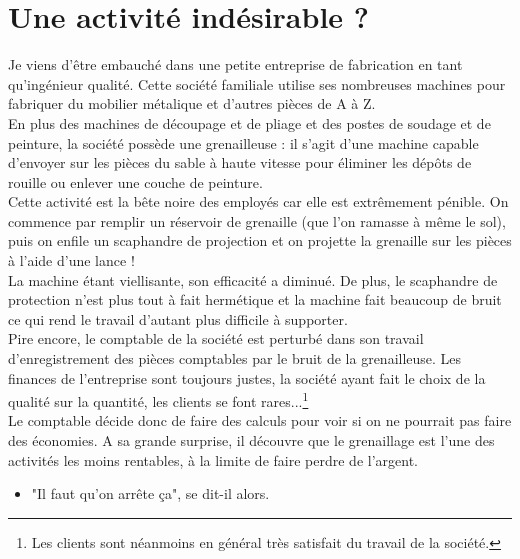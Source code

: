 
\chapter{Une activité indésirable ?}


Je viens d'être embauché dans une petite entreprise de 
fabrication en tant qu'ingénieur qualité. Cette société 
familiale utilise ses nombreuses machines pour fabriquer 
du mobilier métalique et d'autres pièces de A à Z. \\
\hspace*{\parindent}En plus des machines de découpage et de pliage et des postes  
de soudage et de peinture, la société possède une grenailleuse :
il s'agit d'une machine capable d'envoyer sur les pièces du 
sable à haute vitesse pour éliminer les dépôts de rouille ou 
enlever une couche de peinture. \\
\hspace*{\parindent}Cette activité est la bête noire des employés car elle est 
extrêmement pénible. On commence par remplir un réservoir de 
grenaille (que l'on ramasse à même le sol), puis on 
enfile un scaphandre de projection et on projette la grenaille 
sur les pièces à l'aide d'une lance ! \\
\hspace*{\parindent}La machine étant viellisante, son efficacité a diminué. 
De plus, le scaphandre de protection n'est plus tout à fait 
hermétique et la machine fait beaucoup de bruit ce qui rend 
le travail d'autant plus difficile à supporter. \\
\hspace*{\parindent}Pire encore, le comptable de la société est perturbé dans son 
travail d'enregistrement des pièces comptables par le bruit de 
la grenailleuse. Les finances de l'entreprise sont toujours 
justes, la société ayant fait le choix de la qualité sur la 
quantité, les clients se font rares...\footnote{Les clients 
sont néanmoins en général très satisfait du travail de la 
société.} \\ 
\hspace*{\parindent}Le comptable décide donc de faire des calculs pour voir si on 
ne pourrait pas faire des économies. A sa grande surprise, il 
découvre que le grenaillage est l'une des activités les moins 
rentables, à la limite de faire perdre de l'argent.
\begin{itemize}
 \item "Il faut qu'on arrête ça", se dit-il alors.
\end{itemize}
